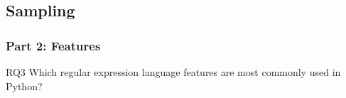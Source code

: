 
\subsection{Sampling}

\begin{frame}
\frametitle{Part 2: Features}

\begin{block}{RQ3}
Which regular expression language features are most commonly used in Python?
\end{block}
\end{frame}

